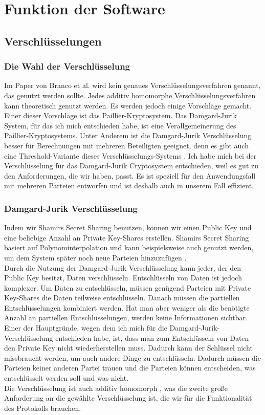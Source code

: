 \chapter{Funktion der Software}

\section{Verschlüsselungen}
\subsection{Die Wahl der Verschlüsselung}
Im Paper von Branco et al. \cite{Doettling2021} wird kein genaues Verschlüsselungsverfahren genannt, das genutzt werden sollte. Jedes additiv homomorphe Verschlüsselungsverfahren kann theoretisch genutzt werden. Es werden jedoch einige Vorschläge  gemacht. Einer dieser Vorschläge ist das Paillier-Kryptosystem. Das Damgard-Jurik System, für das ich mich entschieden habe, ist eine Verallgemeinerung des Paillier-Kryptosystems. Unter Anderem ist die Damgard-Jurik Verschlüsselung besser für Berechnungen mit mehreren Beteiligten geeignet, denn es gibt auch eine Threshold-Variante dieses Verschlüsselungs-Systems \cite{IvanDamgard2004}.
Ich habe mich bei der Verschlüsselung für das Damgard-Jurik Cryptosystem entschieden, weil es gut zu den Anforderungen, die wir haben, passt. Es ist speziell für den Anwendungsfall mit mehreren Parteien entworfen und ist deshalb auch in unserem Fall effizient.\\

\subsection{Damgard-Jurik Verschlüsselung}
Indem wir Shamirs Secret Sharing benutzen, können wir einen Public Key und eine beliebige Anzahl an Private Key-Shares erstellen. Shamirs Secret Sharing basiert auf Polynominterpolation und kann beispielsweise auch genutzt werden, um dem System später noch neue Parteien hinzuzufügen \cite{Shamir1979}.\\
Durch die Nutzung der Damgard-Jurik Verschlüsselung kann jeder, der den Public Key besitzt, Daten verschlüsseln. Entschlüsseln von Daten ist jedoch komplexer. Um Daten zu entschlüsseln, müssen genügend Parteien mit Private Key-Shares die Daten teilweise entschlüsseln. Danach müssen die partiellen Entschlüsselungen kombiniert werden. Hat man aber weniger als die benötigte Anzahl an partiellen Entschlüsselungen, werden keine Informationen sichtbar. \cite{IvanDamgard2004}\\
Einer der Hauptgründe, wegen dem ich mich für die Damgard-Jurik-Verschlüsselung entschieden habe, ist, dass man zum Entschlüsseln von Daten den Private Key nicht wiederherstellen muss. Dadurch kann der Schlüssel nicht missbraucht werden, um auch andere Dinge zu entschlüsseln. Dadurch müssen die Parteien keiner anderen Partei trauen und die Parteien können entscheiden, was entschlüsselt werden soll und was nicht.\\
Die Verschlüsselung ist auch additiv homomorph \cite{IvanDamgard2004}, was die zweite große Anforderung an die gewählte Verschlüsselung ist, die wir für die Funktionalität des Protokolls brauchen. 

